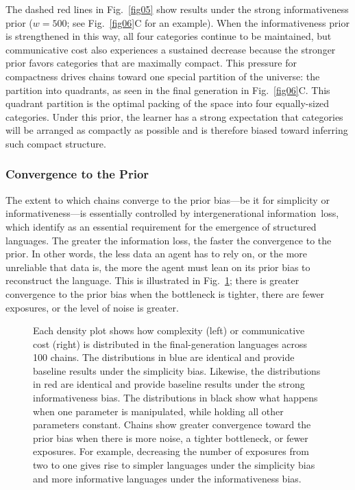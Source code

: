 \documentclass[doc,biblatex]{apa7}
\begin{document}
The dashed red lines in Fig.~\ref{fig05} show results under the strong informativeness prior ($w=500$; see Fig.~\ref{fig06}C for an example). When the informativeness prior is strengthened in this way, all four categories continue to be maintained, but communicative cost also experiences a sustained decrease because the stronger prior favors categories that are maximally compact. This pressure for compactness drives chains toward one special partition of the universe: the partition into quadrants, as seen in the final generation in Fig.~\ref{fig06}C. This quadrant partition is the optimal packing of the space into four equally-sized categories. Under this prior, the learner has a strong expectation that categories will be arranged as compactly as possible and is therefore biased toward inferring such compact structure.

\subsubsection{Convergence to the Prior}

The extent to which chains converge to the prior bias---be it for simplicity or informativeness---is essentially controlled by intergenerational information~loss, which \textcite{Spike:2017} identify as an essential requirement for the emergence of structured languages. The greater the information loss, the faster the convergence to the prior. In other words, the less data an agent has to rely on, or the more unreliable that data is, the more the agent must lean on its prior bias to reconstruct the language. This is illustrated in Fig.~\ref{fig07}; there is greater convergence to the prior bias when the bottleneck is tighter, there are fewer exposures, or the level of noise is greater.

	\begin{figure}
	\vspace*{2pt}
	\caption{Each density plot shows how complexity (left) or communicative cost (right) is distributed in the final-generation languages across 100 chains. The distributions in blue are identical and provide baseline results under the simplicity bias. Likewise, the distributions in red are identical and provide baseline results under the strong informativeness bias. The distributions in black show what happens when one parameter is manipulated, while holding all other parameters constant. Chains show greater convergence toward the prior bias when there is more noise, a tighter bottleneck, or fewer exposures. For example, decreasing the number of exposures from two to one gives rise to simpler languages under the simplicity bias and more informative languages under the informativeness bias.}
	\label{fig07}
	\end{figure}
\end{document}
